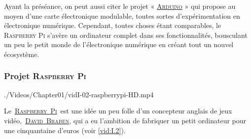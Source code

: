 Ayant la préséance, on peut aussi citer le projet « \href{https://www.arduino.cc/}{\textsc{Arduino}} » qui propose au moyen d'une carte électronique modulable, toutes sortes d'expérimentation en électronique numérique. Cependant, toutes choses étant comparables, le \textsc{Raspberry Pi} s'avère un ordinateur complet dans ses fonctionnalités, bousculant un peu le petit monde de l'électronique numérique en créant tout un nouvel écosystème.

\vspace*{-2pt}
\subsubsection[Projet \textsc{Raspberry Pi}]{Projet \textsc{Raspberry Pi}}
\label{subsub:I.1.2.1}

\begin{marginvideo}
		{./Videos/Chapter01/vidI-02-raspberrypi-HD.mp4}%
\end{marginvideo}

Le \href{https://fr.wikipedia.org/wiki/Raspberry_Pi}{\textsc{Raspberry Pi}} est une idée un peu folle d'un concepteur anglais de jeux vidéo, \href{https://en.wikipedia.org/wiki/David_Braben}{\textsc{David Braben}}, qui a eu l'ambition de fabriquer un petit ordinateur pour une cinquantaine d'euros (voir \cref{vid:I.2}).

